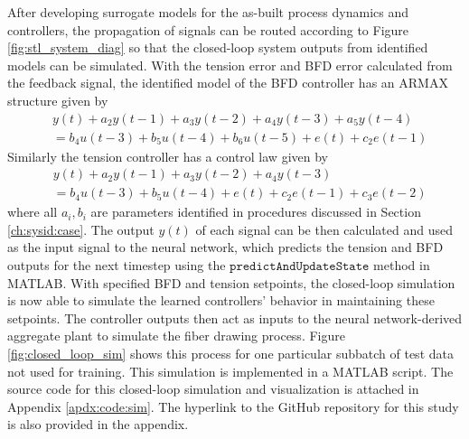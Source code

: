 After developing surrogate models for the as-built process dynamics and controllers, the propagation of signals can be routed according to Figure \ref{fig:stl_system_diag} so that the closed-loop system outputs from identified models can be simulated. With the tension error and BFD error calculated from the feedback signal, the identified model of the BFD controller has an ARMAX structure given by 
\begin{equation}
    \begin{split}
        & y(t) + a_2y(t-1)+a_3y(t-2)+a_4y(t-3)+a_5y(t-4) \\ & = b_4u(t-3)+b_5u(t-4)+b_6u(t-5)+e(t)+c_2e(t-1)
    \end{split}
\end{equation}
Similarly the tension controller has a control law given by 
\begin{equation}
    \begin{split}
        & y(t) + a_2y(t-1)+a_3y(t-2)+a_4y(t-3) \\ & = b_4u(t-3)+b_5u(t-4)+e(t)+c_2e(t-1)+c_3e(t-2)
    \end{split}
\end{equation}
where all $a_i, b_i$ are parameters identified in procedures discussed in Section \ref{ch:sysid:case}. The output $y(t)$ of each signal can be then calculated and used as the input signal to the neural network, which predicts the tension and BFD outputs for the next timestep using the $\texttt{predictAndUpdateState}$ method in MATLAB. With specified BFD and tension setpoints, the closed-loop simulation is now able to simulate the learned controllers' behavior in maintaining these setpoints. The controller outputs then act as inputs to the neural network-derived aggregate plant to simulate the fiber drawing process. Figure \ref{fig:closed_loop_sim} shows this process for one particular subbatch of test data not used for training. This simulation is implemented in a MATLAB script. The source code for this closed-loop simulation and visualization is attached in Appendix \ref{apdx:code:sim}. The hyperlink to the GitHub repository for this study is also provided in the appendix.

